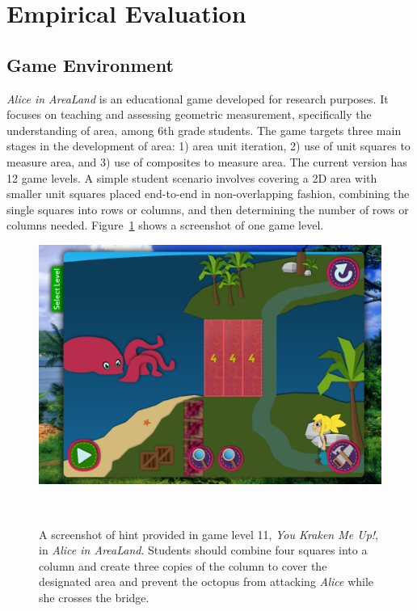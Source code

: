 \documentclass{sigchi}
\begin{document}
\section{Empirical Evaluation}

\subsection{Game Environment}
\textit {Alice in AreaLand} is an educational game developed for research purposes. It focuses on teaching and assessing geometric measurement, specifically the understanding of area, among 6th grade students. The game targets three main stages in the development of area: 1) area unit iteration, 2) use of unit squares to measure area, and 3) use of composites to measure area. The current version has 12 game levels. A simple student scenario involves covering a 2D area with smaller unit squares placed end-to-end in non-overlapping fashion, combining the single squares into rows or columns, and then determining the number of rows or columns needed. Figure~\ref{fig:figurekracken} shows a screenshot of one game level.

\begin{figure}
	\centering
	\includegraphics[width=0.9\columnwidth]{figures/kracken}
	\caption{A screenshot of hint provided in game level 11, \textit {You Kraken Me Up!}, in \textit {Alice in AreaLand}. Students should combine four squares into a column and create three copies of the column to cover the designated area and prevent the octopus from attacking \textit {Alice} while she crosses the bridge.}~\label{fig:figurekracken}
\end{figure}
\end{document}

